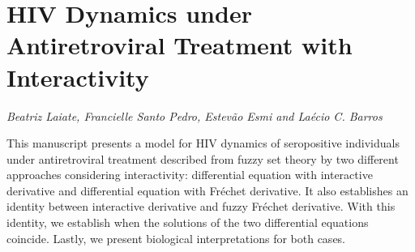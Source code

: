 \documentclass[../booklet.tex]{subfiles}
\begin{document}
\section[HIV Dynamics under Antiretroviral Treatment with Interactivity. {\it Beatriz Laiate, Francielle Santo Pedro, Estevão Esmi and Laécio C. Barros}]{HIV Dynamics under Antiretroviral Treatment with Interactivity}
   

\begin{center}
  {\it Beatriz Laiate, Francielle Santo Pedro, Estevão Esmi and Laécio C. Barros}
\end{center}

\vskip 0.8cm


This manuscript presents a model for HIV dynamics of seropositive individuals under antiretroviral treatment described from fuzzy set theory by two different approaches considering interactivity: differential equation with interactive derivative and differential equation with Fr\'echet derivative. It also establishes an identity between interactive derivative and fuzzy Fr\'echet derivative. With this identity, we establish when the solutions of the two differential equations coincide. Lastly, we present biological interpretations for both cases.

\end{document}
